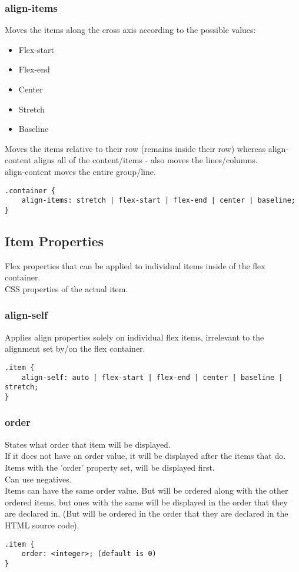 \documentclass[]{article}
\begin{document}
\subsubsection{align-items}
Moves the items along the cross axis according to the possible values:
\begin{itemize}
	\item Flex-start
	\item Flex-end
	\item Center
	\item Stretch
	\item Baseline
\end{itemize}
Moves the items relative to their row (remains inside their row) whereas align-content aligns all of the content/items - also moves the lines/columns.
\\
align-content moves the entire group/line.
\begin{lstlisting}
.container {
	align-items: stretch | flex-start | flex-end | center | baseline;
}
\end{lstlisting}

\subsection{Item Properties}
Flex properties that can be applied to individual items inside of the flex container.  
\\
CSS properties of the actual item.

\subsubsection{align-self}
Applies align properties solely on individual flex items, irrelevant to the alignment set by/on the flex container.
\begin{lstlisting}
.item {
	align-self: auto | flex-start | flex-end | center | baseline | stretch;
}
\end{lstlisting}

\subsubsection{order}
States what order that item will be displayed.
\\
If it does not have an order value, it will be displayed after the items that do.  
\\
Items with the 'order' property set, will be displayed first.
\\
Can use negatives.
\\
Items can have the same order value.  But will be ordered along with the other ordered items, but ones with the same will be displayed in the order that they are declared in.  (But will be ordered in the order that they are declared in the HTML source code).
\begin{lstlisting}
.item {
	order: <integer>; (default is 0)
}
\end{lstlisting}
\end{document}
